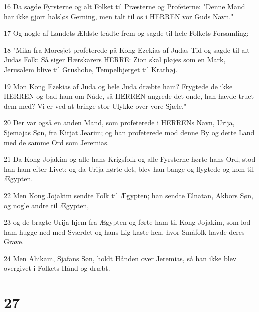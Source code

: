 \par 16 Da sagde Fyrsterne og alt Folket til Præsterne og Profeterne: "Denne Mand har ikke gjort halsløs Gerning, men talt til os i HERREN vor Guds Navn."
\par 17 Og nogle af Landets Ældste trådte frem og sagde til hele Folkets Forsamling:
\par 18 "Mika fra Moresjet profeterede på Kong Ezekias af Judas Tid og sagde til alt Judas Folk: Så siger Hærskarers HERRE: Zion skal pløjes som en Mark, Jerusalem blive til Grushobe, Tempelbjerget til Krathøj.
\par 19 Mon Kong Ezekias af Juda og hele Juda dræbte ham? Frygtede de ikke HERREN og bad ham om Nåde, så HERREN angrede det onde, han havde truet dem med? Vi er ved at bringe stor Ulykke over vore Sjæle."
\par 20 Der var også en anden Mand, som profeterede i HERRENs Navn, Urija, Sjemajas Søn, fra Kirjat Jearim; og han profeterede mod denne By og dette Land med de samme Ord som Jeremias.
\par 21 Da Kong Jojakim og alle hans Krigsfolk og alle Fyrsterne hørte hans Ord, stod han ham efter Livet; og da Urija hørte det, blev han bange og flygtede og kom til Ægypten.
\par 22 Men Kong Jojakim sendte Folk til Ægypten; han sendte Elnatan, Akbors Søn, og nogle andre til Ægypten,
\par 23 og de bragte Urija hjem fra Ægypten og førte ham til Kong Jojakim, som lod ham hugge ned med Sværdet og hans Lig kaste hen, hvor Småfolk havde deres Grave.
\par 24 Men Ahikam, Sjafans Søn, holdt Hånden over Jeremias, så han ikke blev overgivet i Folkets Hånd og dræbt.

\chapter{27}

